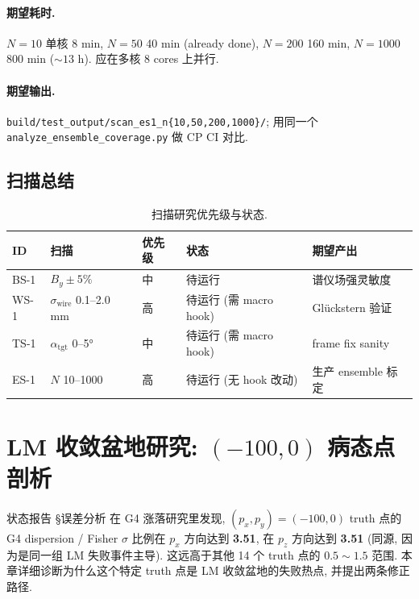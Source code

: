 \paragraph{期望耗时.} $N=10$ 单核 8 min, $N=50$ 40 min (already done), $N=200$ 160 min, $N=1000$ 800 min ($\sim 13$ h). 应在多核 8 cores 上并行.

\paragraph{期望输出.}
\texttt{build/test\_output/scan\_es1\_n\{10,50,200,1000\}/}; 用同一个 \texttt{analyze\_ensemble\_coverage.py} 做 CP CI 对比.

\subsection{扫描总结}
\label{sec:partIII:scans:summary}

\begin{table}[H]
\centering\small
\caption{扫描研究优先级与状态.}
\label{tab:partIII:scan_priority}
\begin{tabular}{lllll}
\toprule
ID & 扫描 & 优先级 & 状态 & 期望产出 \\
\midrule
BS-1 & $B_y \pm 5\%$        & 中 & 待运行 & 谱仪场强灵敏度 \\
WS-1 & $\sigma_{\mathrm{wire}}$ 0.1--2.0 mm & 高 & 待运行 (需 macro hook) & Glückstern 验证 \\
TS-1 & $\alpha_{\mathrm{tgt}}$ 0--5°  & 中 & 待运行 (需 macro hook) & frame fix sanity \\
ES-1 & $N$ 10--1000           & 高 & 待运行 (无 hook 改动) & 生产 ensemble 标定 \\
\bottomrule
\end{tabular}
\end{table}


\section{LM 收敛盆地研究: $(-100, 0)$ 病态点剖析}
\label{sec:partIII:basin}

状态报告 §误差分析 在 G4 涨落研究里发现, $(p_x, p_y) = (-100, 0)$ truth 点的 G4 dispersion / Fisher $\sigma$ 比例在 $p_x$ 方向达到 \textbf{3.51}, 在 $p_z$ 方向达到 \textbf{3.51} (同源, 因为是同一组 LM 失败事件主导). 这远高于其他 14 个 truth 点的 $0.5 \sim 1.5$ 范围. 本章详细诊断为什么这个特定 truth 点是 LM 收敛盆地的失败热点, 并提出两条修正路径.

